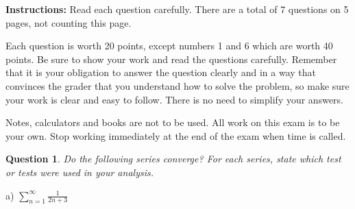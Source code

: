 \begin{titlepage}
{\begin{center}
\end{center}
}

\bigskip

{\bf Instructions:}  Read each question carefully.
There are
a total of 7 questions on 5
pages, not counting this page.


\medskip
Each question is worth 20 points, except numbers 1 and 6 which are worth 40 points.
Be sure to show your work and read the
questions carefully.  Remember that it is your obligation to answer
the question clearly and in a way that convinces the grader that
you understand how to solve the problem, so make sure your work
is clear and easy to follow.  There is no need to simplify your
answers.

\medskip
Notes, calculators and books are not to be used.
All work on this exam is to be your own.
Stop working immediately at the end of the exam
when time is called.
\end{titlepage}
%
\newtheorem{question}{Question}
\newcommand{\quest}
{\begin{question} \em \noindent
}


\newcommand{\ds}
{\displaystyle}

\newcommand{\quend}
{\end{question}}


\newcommand{\ii}
 {\mbox{$\bf \hat{\mbox{\i} }$}}

\newcommand{\jj}
 {\mbox{$\bf \hat{\mbox{\j} }$}}

\newcommand{\kk}
 {\mbox{$\bf \hat{\mbox{k} }$}}

\newcommand{\nhat}
 {\mbox{$\bf \mbox{n}$}}

\newcommand{\tang}
 {\mbox{$\bf \mbox{T}$}}

\newcommand{\del}{\partial}

\newcommand{\tfm}
 {\center {\bf \mbox{True \hspace{1in} False \hspace{1in} Meaningless}}}



\newpage


\quest Do the following series converge?  For each series,
state which test or tests were used in your analysis.
\quend

\noindent a) 
$\displaystyle \sum_{\ds n=1}^{\infty} \frac{1}{2n+3}$ 

